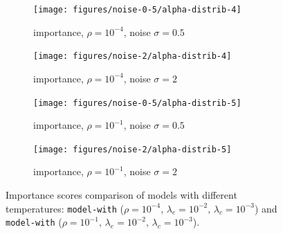 \begin{figure}[!h]
\centering
\begin{subfigure}{.5\textwidth}
  \centering
  \texttt{[image: figures/noise-0-5/alpha-distrib-4]}
  \caption{importance, $\rho=10^{-4}$, noise $\sigma=0.5$} 
  \label{fig:exp-att-shift-2-a}
\end{subfigure}%
\begin{subfigure}{.5\textwidth}
  \centering
  \texttt{[image: figures/noise-2/alpha-distrib-4]}
  \caption{importance, $\rho=10^{-4}$, noise $\sigma=2$} 
  \label{fig:exp-att-shift-2-b}
\end{subfigure}
\begin{subfigure}{.5\textwidth}
  \centering
  \texttt{[image: figures/noise-0-5/alpha-distrib-5]}
  \caption{importance, $\rho=10^{-1}$, noise $\sigma=0.5$} 
  \label{fig:exp-att-shift-2-c}
\end{subfigure}%
\begin{subfigure}{.5\textwidth}
  \centering
  \texttt{[image: figures/noise-2/alpha-distrib-5]}
  \caption{importance, $\rho=10^{-1}$, noise $\sigma=2$} 
  \label{fig:exp-att-shift-2-d}
\end{subfigure}
\caption[Importance scores comparison of models with different temperatures]{Importance scores comparison of models with different temperatures: \texttt{model-with} ($\rho=10^{-4},\,\lambda_e=10^{-2},\,\lambda_c=10^{-3}$) and \texttt{model-with} ($\rho=10^{-1},\,\lambda_e=10^{-2},\,\lambda_c=10^{-3}$).}
\label{fig:exp-att-shift-2}
\end{figure}

